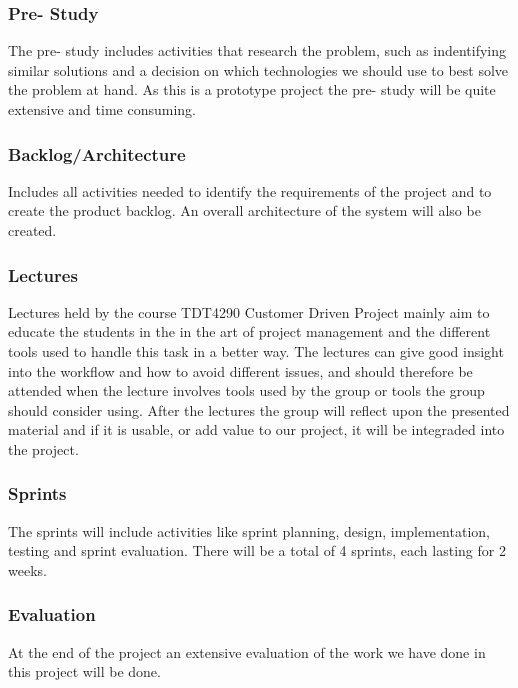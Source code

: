 \subsubsection{Pre- Study}
The pre- study includes activities that research the problem, such as indentifying similar solutions and a decision on which technologies we should use to best solve the problem at hand. As this is a prototype project the pre- study will be quite extensive and time consuming.

\subsubsection{Backlog/Architecture}
Includes all activities needed to identify the requirements of the project and to create the product backlog. An overall architecture of the system will also be created.

\subsubsection{Lectures}
Lectures held by the course TDT4290 Customer Driven Project mainly aim to educate the students in the in the art of project management and the different tools used to handle this task in a better way. The lectures can give good insight into the workflow and how to avoid different issues, and should therefore be attended when the lecture involves tools used by the group or tools the group should consider using. After the lectures the group will reflect upon the presented material and if it is usable, or add value to our project, it will be integraded into the project.

\subsubsection{Sprints}
The sprints will include activities like sprint planning, design, implementation, testing and sprint evaluation. There will be a total of 4 sprints, each lasting for 2 weeks.

\subsubsection{Evaluation}
At the end of the project an extensive evaluation of the work we have done in this project will be done.

